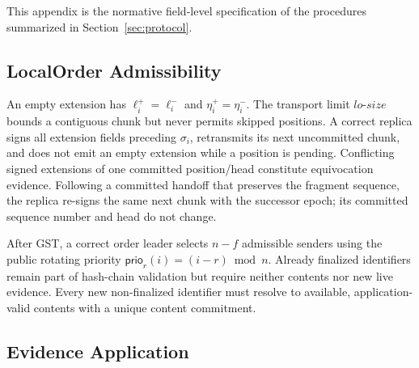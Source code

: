 This appendix is the normative field-level specification of the procedures
summarized in Section~\ref{sec:protocol}.

\subsection{LocalOrder Admissibility}

An empty extension has $\ell_i^+=\ell_i^-$ and
$\eta_i^+=\eta_i^-$.  The transport limit $lo\text{-}size$ bounds a contiguous
chunk but never permits skipped positions.  A correct replica signs all
extension fields preceding $\sigma_i$, retransmits its next uncommitted chunk,
and does not emit an empty extension while a position is pending.  Conflicting
signed extensions of one committed position/head constitute equivocation
evidence.  Following a committed handoff that preserves the fragment sequence,
the replica re-signs the same next chunk with the successor epoch; its committed
sequence number and head do not change.

After GST, a correct order leader selects $n-f$ admissible senders using the
public rotating priority $\mathsf{prio}_r(i)=(i-r)\bmod n$.  Already finalized
identifiers remain part of hash-chain validation but require neither contents
nor new live evidence.  Every new non-finalized identifier must resolve to
available, application-valid contents with a unique content commitment.

\subsection{Evidence Application}


